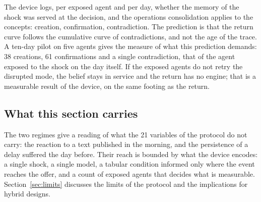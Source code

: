 %

The device logs, per exposed agent and per day, whether the memory of the shock was served at the decision, and the operations consolidation applies to the concepts: creation, confirmation, contradiction. The prediction is that the return curve follows the cumulative curve of contradictions, and not the age of the trace. A ten-day pilot on five agents gives the measure of what this prediction demands: 38 creations, 61 confirmations and a single contradiction, that of the agent exposed to the shock on the day itself. If the exposed agents do not retry the disrupted mode, the belief stays in service and the return has no engine; that is a measurable result of the device, on the same footing as the return.

\subsection{What this section carries}
\label{sec:untabulated-scope}

The two regimes give a reading of what the 21 variables of the protocol do not carry: the reaction to a text published in the morning, and the persistence of a delay suffered the day before. Their reach is bounded by what the device encodes: a single shock, a single model, a tabular condition informed only where the event reaches the offer, and a count of exposed agents that decides what is measurable. Section~\ref{sec:limits} discusses the limits of the protocol and the implications for hybrid designs.

